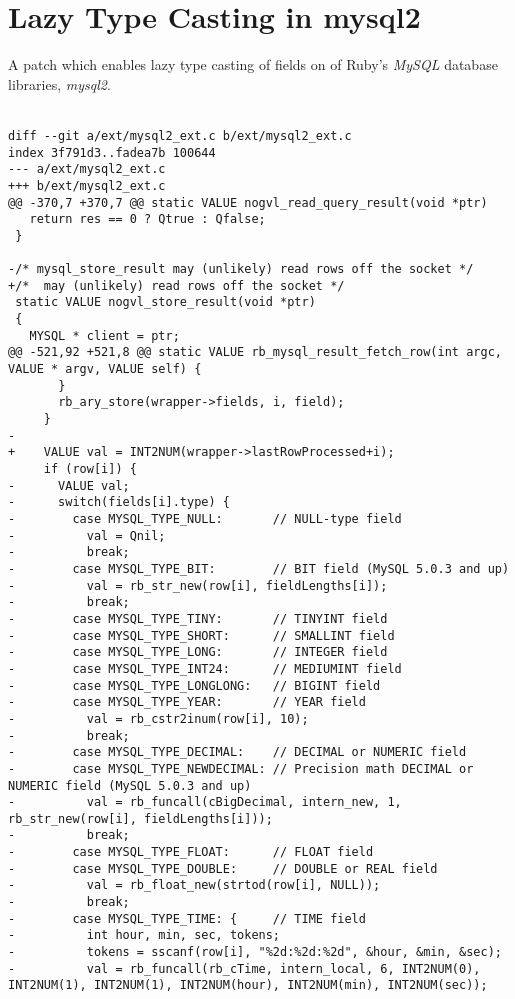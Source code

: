 \chapter{Lazy Type Casting in mysql2} %
\label{ap:mysql2_patch}

A patch which enables lazy type casting of fields on of Ruby's \textit{MySQL} database libraries, \textit{mysql2}.\\\\

\begin{lstlisting}
diff --git a/ext/mysql2_ext.c b/ext/mysql2_ext.c
index 3f791d3..fadea7b 100644
--- a/ext/mysql2_ext.c
+++ b/ext/mysql2_ext.c
@@ -370,7 +370,7 @@ static VALUE nogvl_read_query_result(void *ptr)
   return res == 0 ? Qtrue : Qfalse;
 }
 
-/* mysql_store_result may (unlikely) read rows off the socket */
+/*  may (unlikely) read rows off the socket */
 static VALUE nogvl_store_result(void *ptr)
 {
   MYSQL * client = ptr;
@@ -521,92 +521,8 @@ static VALUE rb_mysql_result_fetch_row(int argc, VALUE * argv, VALUE self) {
       }
       rb_ary_store(wrapper->fields, i, field);
     }
-
+    VALUE val = INT2NUM(wrapper->lastRowProcessed+i);
     if (row[i]) {
-      VALUE val;
-      switch(fields[i].type) {
-        case MYSQL_TYPE_NULL:       // NULL-type field
-          val = Qnil;
-          break;
-        case MYSQL_TYPE_BIT:        // BIT field (MySQL 5.0.3 and up)
-          val = rb_str_new(row[i], fieldLengths[i]);
-          break;
-        case MYSQL_TYPE_TINY:       // TINYINT field
-        case MYSQL_TYPE_SHORT:      // SMALLINT field
-        case MYSQL_TYPE_LONG:       // INTEGER field
-        case MYSQL_TYPE_INT24:      // MEDIUMINT field
-        case MYSQL_TYPE_LONGLONG:   // BIGINT field
-        case MYSQL_TYPE_YEAR:       // YEAR field
-          val = rb_cstr2inum(row[i], 10);
-          break;
-        case MYSQL_TYPE_DECIMAL:    // DECIMAL or NUMERIC field
-        case MYSQL_TYPE_NEWDECIMAL: // Precision math DECIMAL or NUMERIC field (MySQL 5.0.3 and up)
-          val = rb_funcall(cBigDecimal, intern_new, 1, rb_str_new(row[i], fieldLengths[i]));
-          break;
-        case MYSQL_TYPE_FLOAT:      // FLOAT field
-        case MYSQL_TYPE_DOUBLE:     // DOUBLE or REAL field
-          val = rb_float_new(strtod(row[i], NULL));
-          break;
-        case MYSQL_TYPE_TIME: {     // TIME field
-          int hour, min, sec, tokens;
-          tokens = sscanf(row[i], "%2d:%2d:%2d", &hour, &min, &sec);
-          val = rb_funcall(rb_cTime, intern_local, 6, INT2NUM(0), INT2NUM(1), INT2NUM(1), INT2NUM(hour), INT2NUM(min), INT2NUM(sec));

\end{lstlisting}
